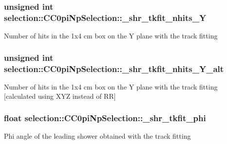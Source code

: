 \subsubsection[{\texorpdfstring{\+\_\+shr\+\_\+tkfit\+\_\+nhits\+\_\+Y}{_shr_tkfit_nhits_Y}}]{\setlength{\rightskip}{0pt plus 5cm}unsigned int selection\+::\+C\+C0pi\+Np\+Selection\+::\+\_\+shr\+\_\+tkfit\+\_\+nhits\+\_\+Y\hspace{0.3cm}{\ttfamily [private]}}\hypertarget{classselection_1_1CC0piNpSelection_ae3a53326b19594013c9df08b66ccaa73}{}\label{classselection_1_1CC0piNpSelection_ae3a53326b19594013c9df08b66ccaa73}
Number of hits in the 1x4 cm box on the Y plane with the track fitting 
\subsubsection[{\texorpdfstring{\+\_\+shr\+\_\+tkfit\+\_\+nhits\+\_\+\+Y\+\_\+alt}{_shr_tkfit_nhits_Y_alt}}]{\setlength{\rightskip}{0pt plus 5cm}unsigned int selection\+::\+C\+C0pi\+Np\+Selection\+::\+\_\+shr\+\_\+tkfit\+\_\+nhits\+\_\+\+Y\+\_\+alt\hspace{0.3cm}{\ttfamily [private]}}\hypertarget{classselection_1_1CC0piNpSelection_ae147f3006253b7689636993c76221f21}{}\label{classselection_1_1CC0piNpSelection_ae147f3006253b7689636993c76221f21}
Number of hits in the 1x4 cm box on the Y plane with the track fitting \mbox{[}calculated using X\+YZ instead of RR\mbox{]} 
\subsubsection[{\texorpdfstring{\+\_\+shr\+\_\+tkfit\+\_\+phi}{_shr_tkfit_phi}}]{\setlength{\rightskip}{0pt plus 5cm}float selection\+::\+C\+C0pi\+Np\+Selection\+::\+\_\+shr\+\_\+tkfit\+\_\+phi\hspace{0.3cm}{\ttfamily [private]}}\hypertarget{classselection_1_1CC0piNpSelection_aefb0bc61c417330a448ababb5363ad8f}{}\label{classselection_1_1CC0piNpSelection_aefb0bc61c417330a448ababb5363ad8f}
Phi angle of the leading shower obtained with the track fitting 
